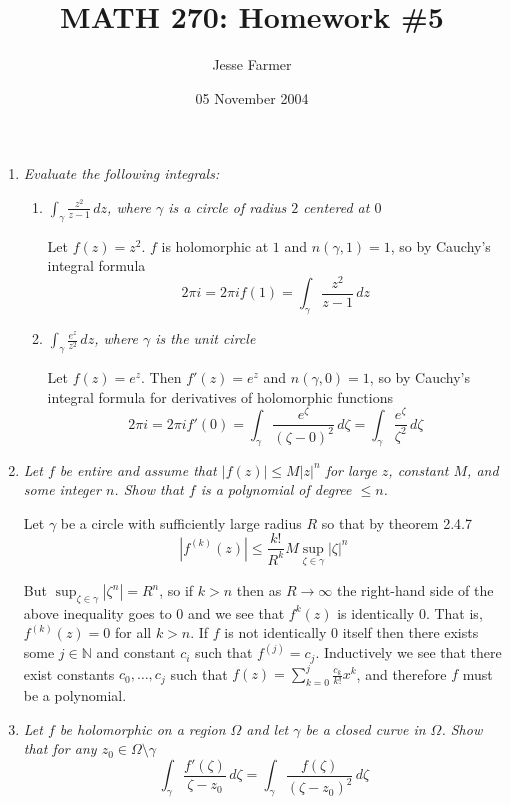 \documentclass[letterpaper, 11pt]{article}
\title{MATH 270: Homework \#5}
\author{Jesse Farmer}
\date{05 November 2004}
\begin{document}
\maketitle
\begin{enumerate}

\item \emph{Evaluate the following integrals:}
\begin{enumerate}
\item \emph{$\int_{\gamma} \frac{z^2}{z-1} \,dz$, where $\gamma$ is a circle of radius $2$ centered at $0$}

Let $f(z) = z^2$.  $f$ is holomorphic at $1$ and $n(\gamma, 1) = 1$, so by Cauchy's integral formula
\[
2\pi i = 2 \pi i f(1) = \int_{\gamma} \frac{z^2}{z-1} \,dz
\]
\item \emph{$\int_{\gamma} \frac{e^z}{z^2} \,dz$, where $\gamma$ is the unit circle}

Let $f(z) = e^z$.  Then $f'(z) = e^z$ and $n(\gamma, 0) = 1$, so by Cauchy's integral formula for derivatives of holomorphic functions
\[
2\pi i = 2\pi i f'(0) = \int_{\gamma} \frac{e^\zeta}{(\zeta - 0)^2} \,d\zeta = \int_{\gamma} \frac{e^\zeta}{\zeta^2} \,d\zeta
\]

\end{enumerate}

\item \emph{Let $f$ be entire and assume that $|f(z)| \leq M|z|^n$ for large $z$, constant $M$, and some integer $n$.  Show that $f$ is a polynomial of degree $\leq n$.}

Let $\gamma$ be a circle with sufficiently large radius $R$ so that by theorem 2.4.7
\[
|f^{(k)}(z)| \leq \frac{k!}{R^k} M \sup_{\zeta \in \gamma} |\zeta|^n
\]

But $\sup_{\zeta \in \gamma}|\zeta^n| = R^n$, so if $k > n$ then as $R \rightarrow \infty$ the right-hand side of the above inequality goes to $0$ and we see that $f^{k}(z)$ is identically $0$.  That is, $f^{(k)}(z) = 0$ for all $k > n$.  If $f$ is not identically $0$ itself then there exists some $j \in \mathbb{N}$ and constant $c_i$ such that $f^{(j)}=c_j$.  Inductively we see that there exist constants $c_0, \ldots, c_j$ such that $f(z) = \sum_{k=0}^j \frac{c_k}{k!}x^k$, and therefore $f$ must be a polynomial.

\item \emph{Let $f$ be holomorphic on a region $\Omega$ and let $\gamma$ be a closed curve in $\Omega$.  Show that for any $z_0 \in \Omega \setminus \gamma$ $$\int_{\gamma} \frac{f'(\zeta)}{\zeta - z_0} \,d\zeta = \int_{\gamma} \frac{f(\zeta)}{(\zeta - z_0)^2} \,d\zeta$$}


\end{enumerate}
\end{document}
